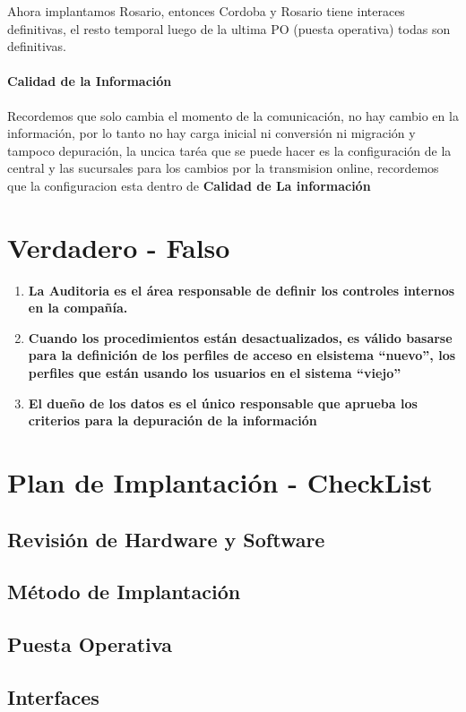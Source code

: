 \documentclass[12pt]{book}
\begin{document}
Ahora implantamos Rosario,  entonces Cordoba y Rosario tiene interaces definitivas, el resto temporal
luego de la ultima PO (puesta operativa) todas son definitivas.

\subsubsection{Calidad de la Información}
Recordemos que solo cambia el momento de la comunicación, no hay cambio en la información, por lo tanto no hay carga inicial ni conversión ni migración y tampoco depuración, la uncica taréa que se puede hacer es la configuración de la central y las sucursales para los cambios por la transmision online, recordemos que la configuracion esta dentro de \textbf{Calidad de La información}


\chapter{Verdadero - Falso}
\begin{enumerate}
	\item	\textbf{La Auditoria es el área responsable de definir los controles internos en la compañía.}
	\item	\textbf{Cuando los procedimientos están desactualizados, es válido basarse para la definición de los perfiles de acceso en elsistema “nuevo”, los perfiles que están usando los usuarios en el sistema “viejo”}
	\item	\textbf{El dueño de los datos es el único responsable que aprueba los criterios para la depuración de la información}
\end{enumerate}


\chapter{Plan de Implantación - CheckList}
\section{Revisión de Hardware y Software}
\section{Método de Implantación}

\section{Puesta Operativa}
\section{Interfaces}
\end{document}
